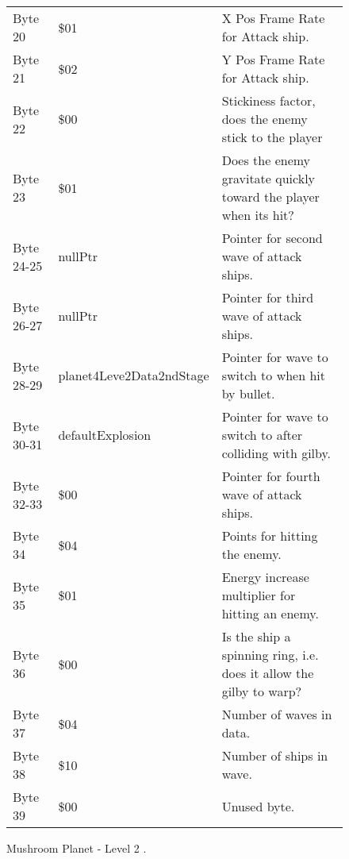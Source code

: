 \begin{figure}[H]
{\begin{adjustbox}{width=12cm}
\begin{tabular}{lll}
 Byte 20    & \$01                      & X Pos Frame Rate for Attack ship.                                   \\
 Byte 21    & \$02                      & Y Pos Frame Rate for Attack ship.                                   \\
 Byte 22    & \$00                      & Stickiness factor, does the enemy stick to the player               \\
 Byte 23    & \$01                      & Does the enemy gravitate quickly toward the player when its hit?    \\
 Byte 24-25 & nullPtr                  & Pointer for second wave of attack ships.                            \\
 Byte 26-27 & nullPtr                  & Pointer for third wave of attack ships.                             \\
 Byte 28-29 & planet4Leve2Data2ndStage & Pointer for wave to switch to when hit by bullet.                   \\
 Byte 30-31 & defaultExplosion         & Pointer for  wave to switch to after colliding with gilby.          \\
 Byte 32-33 & \$00                      & Pointer for fourth wave of attack ships.                            \\
 Byte 34    & \$04                      & Points for hitting the enemy.                                       \\
 Byte 35    & \$01                      & Energy increase multiplier for hitting an enemy.                    \\
 Byte 36    & \$00                      & Is the ship a spinning ring, i.e. does it allow the gilby to warp?  \\
 Byte 37    & \$04                      & Number of waves in data.                                            \\
 Byte 38    & \$10                      & Number of ships in wave.                                            \\
 Byte 39    & \$00                      & Unused byte.                                                        \\
\bottomrule
\end{tabular}

  \end{adjustbox}

  }\caption*{Mushroom Planet - Level 2
.}
\end{figure}

